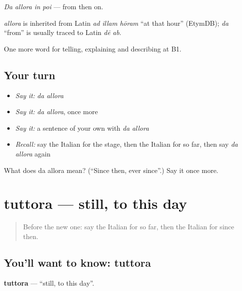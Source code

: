 \emph{Da allora in poi} — from then on.

\begin{cousinweb}
\emph{allora} is inherited from Latin \emph{ad illam hōram} \textquotedblleft{}at that hour\textquotedblright{} (EtymDB); \emph{da} \textquotedblleft{}from\textquotedblright{} is usually traced to Latin \emph{dē ab}.
\end{cousinweb}

\begin{grammarlens}[title={What you've built}]
One more word for telling, explaining and describing at B1.
\end{grammarlens}

\subsection*{Your turn}
\begin{itemize}
\raggedright
  \item \emph{Say it:} \emph{da allora}
  \item \emph{Say it:} \emph{da allora}, once more
  \item \emph{Say it:} a sentence of your own with \emph{da allora}
  \item \emph{Recall:} say the Italian for the stage, then the Italian for so far, then say \emph{da allora} again
\end{itemize}

\begin{tcolorbox}[breakable,colback=teal!4,colframe=teal!35!black,title={Before you move on}]
What does da allora mean? (\textquotedblleft{}Since then, ever since\textquotedblright{}.) Say it once more.
\end{tcolorbox}
\section[tuttora]{tuttora — still, to this day}

\label{lesson:IT-C280-tuttora}



\begin{quote}
Before the new one: say the Italian for so far, then the Italian for since then.
\end{quote}

\subsection*{You'll want to know: tuttora}
\textbf{tuttora} — \textquotedblleft{}still, to this day\textquotedblright{}.

